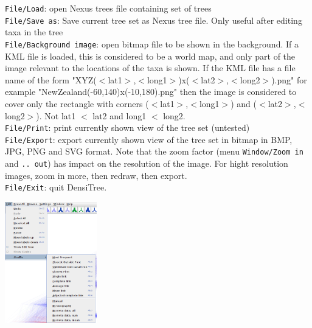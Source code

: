\documentclass{article}
\def\DensiTree{DensiTree}
\begin{document}
\noindent
{\tt File/Load}: open Nexus trees file containing set of trees\\
{\tt File/Save as}: Save current tree set as Nexus tree file. Only useful after editing taxa in the tree\\
{\tt File/Background image}: open bitmap file to be shown in the background. If a KML file is
loaded, this is considered to be a world map, and only part of the image relevant to the locations
of the taxa is shown. If the KML file has a file name of the form "XYZ($<$lat1$>$,$<$long1$>$)x($<$lat2$>$,$<$long2$>$).png"
for example "NewZealand(-60,140)x(-10,180).png"
then the image is considered to cover only the rectangle with corners  ($<$lat1$>$,$<$long1$>$) and 
($<$lat2$>$,$<$long2$>$). Not lat1 $<$ lat2 and long1 $<$ long2.\\
{\tt File/Print}: print currently shown view of the tree set (untested)\\
{\tt File/Export}: export currently shown view of the tree set in bitmap in BMP, JPG, PNG and SVG
format.
Note that the zoom factor (menu {\tt Window/Zoom in} and {\tt .. out}) has impact on the resolution 
of the image. For hight resolution images, zoom in more, then redraw, then export.\\
{\tt File/Exit}: quit \DensiTree.

\begin{center}
\includegraphics[width=4cm]{menuedit.png}
\end{center}
\end{document}
